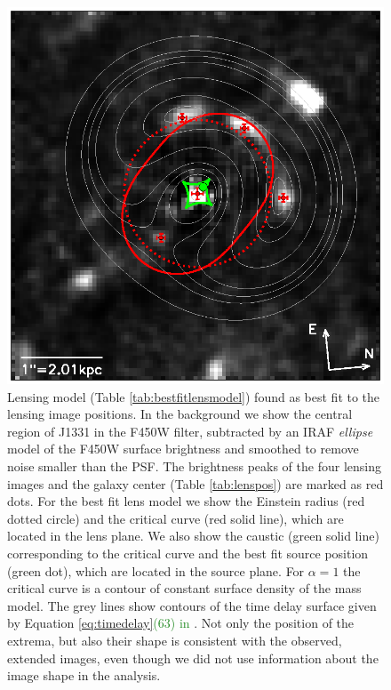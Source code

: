 \documentclass[useAMS,usenatbib]{mnras}
\newcommand{\NEW}[1]{\textcolor{ForestGreen}{#1}}
\newcommand{\OLD}[1]{\textcolor{Red}{#1}}
\begin{document}
\begin{figure}
\centering
  \includegraphics[width=\linewidth]{fig/lens_all_in_one.ps}
\caption{Lensing model (Table \ref{tab:bestfitlensmodel}) found as best fit to the lensing image positions. In the background we show the central region of J1331 in the F450W filter, subtracted by an IRAF \emph{ellipse} model of the F450W surface brightness and smoothed to remove noise smaller than the PSF. The brightness peaks of the four lensing images and the galaxy center (Table \ref{tab:lenspos}) are marked as red dots. For the best fit lens model we show the Einstein radius (red dotted circle) and the critical curve (red solid line), which are located in the lens plane. We also show the caustic (green solid line) corresponding to the critical curve and the best fit source position (green dot), which are located in the source plane. For $\alpha=1$ the critical curve is a contour of constant surface density of the mass model. The grey  lines show contours of the time delay surface given by Equation \OLD{\eqref{eq:timedelay}}\NEW{(63) in \citet{1996astro.ph..6001N}}. Not only the position of the extrema, but also their shape is consistent with the observed, extended images, even though we did not use information about the image shape in the analysis.}
\label{fig:bestfitlensmodel}
\end{figure}
\end{document}
